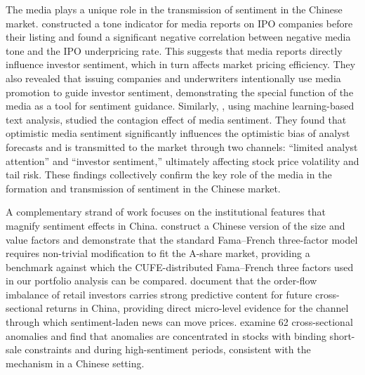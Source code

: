 \documentclass[AER]{AEA}
\begin{document}
The media plays a unique role in the transmission of sentiment in the Chinese market. \citet{JRYJ201509012} constructed a tone indicator for media reports on IPO companies before their listing and found a significant negative correlation between negative media tone and the IPO underpricing rate. This suggests that media reports directly influence investor sentiment, which in turn affects market pricing efficiency. They also revealed that issuing companies and underwriters intentionally use media promotion to guide investor sentiment, demonstrating the special function of the media as a tool for sentiment guidance. Similarly, \citet{GLSJ202101014}, using machine learning-based text analysis, studied the contagion effect of media sentiment. They found that optimistic media sentiment significantly influences the optimistic bias of analyst forecasts and is transmitted to the market through two channels: ``limited analyst attention'' and ``investor sentiment,'' ultimately affecting stock price volatility and tail risk. These findings collectively confirm the key role of the media in the formation and transmission of sentiment in the Chinese market.

A complementary strand of work focuses on the institutional features that magnify sentiment effects in China. \citet{liu2019size} construct a Chinese version of the size and value factors and demonstrate that the standard Fama--French three-factor model requires non-trivial modification to fit the A-share market, providing a benchmark against which the CUFE-distributed Fama--French \citeyearpar{fama1993common} three factors used in our portfolio analysis can be compared. \citet{jones2025retail} document that the order-flow imbalance of retail investors carries strong predictive content for future cross-sectional returns in China, providing direct micro-level evidence for the channel through which sentiment-laden news can move prices. \citet{han2022chinese} examine 62 cross-sectional anomalies and find that anomalies are concentrated in stocks with binding short-sale constraints and during high-sentiment periods, consistent with the \citet{stambaugh2012short} mechanism in a Chinese setting.
\end{document}
